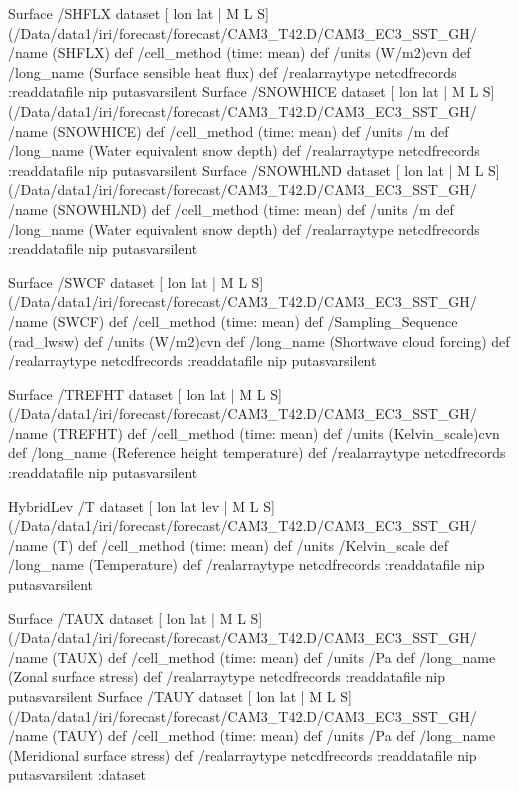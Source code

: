 \begin{ingrid}
Surface /SHFLX{
dataset
[ lon lat | M L S] (/Data/data1/iri/forecast/forecast/CAM3_T42.D/CAM3_EC3_SST_GH/%
/name (SHFLX) def
 /cell_method (time: mean) def
 /units (W/m2)cvn def
 /long_name (Surface sensible heat flux) def
 /realarraytype netcdfrecords :readdatafile
nip
}putasvarsilent
Surface /SNOWHICE{
dataset
[ lon lat | M L S] (/Data/data1/iri/forecast/forecast/CAM3_T42.D/CAM3_EC3_SST_GH/%
/name (SNOWHICE) def
 /cell_method (time: mean) def
 /units /m def
 /long_name (Water equivalent snow depth) def
 /realarraytype netcdfrecords :readdatafile
nip
}putasvarsilent
Surface /SNOWHLND{
dataset
[ lon lat | M L S] (/Data/data1/iri/forecast/forecast/CAM3_T42.D/CAM3_EC3_SST_GH/%
/name (SNOWHLND) def
 /cell_method (time: mean) def
 /units /m def
 /long_name (Water equivalent snow depth) def
 /realarraytype netcdfrecords :readdatafile
nip
}putasvarsilent


Surface /SWCF{
dataset
[ lon lat | M L S] (/Data/data1/iri/forecast/forecast/CAM3_T42.D/CAM3_EC3_SST_GH/%
/name (SWCF) def
 /cell_method (time: mean) def
 /Sampling_Sequence (rad_lwsw) def
 /units (W/m2)cvn def
 /long_name (Shortwave cloud forcing) def
 /realarraytype netcdfrecords :readdatafile
nip
}putasvarsilent

Surface /TREFHT{
dataset
[ lon lat | M L S] (/Data/data1/iri/forecast/forecast/CAM3_T42.D/CAM3_EC3_SST_GH/%
/name (TREFHT) def
 /cell_method (time: mean) def
 /units (Kelvin_scale)cvn def
 /long_name (Reference height temperature) def
 /realarraytype netcdfrecords :readdatafile
nip
}putasvarsilent

HybridLev /T{
dataset
[ lon lat lev | M L S] (/Data/data1/iri/forecast/forecast/CAM3_T42.D/CAM3_EC3_SST_GH/%
/name (T) def
 /cell_method (time: mean) def
 /units /Kelvin_scale def
 /long_name (Temperature) def
 /realarraytype netcdfrecords :readdatafile
nip
}putasvarsilent

Surface /TAUX{
dataset
[ lon lat | M L S] (/Data/data1/iri/forecast/forecast/CAM3_T42.D/CAM3_EC3_SST_GH/%
/name (TAUX) def
 /cell_method (time: mean) def
 /units /Pa def
 /long_name (Zonal surface stress) def
 /realarraytype netcdfrecords :readdatafile
nip
}putasvarsilent
Surface /TAUY{
dataset
[ lon lat | M L S] (/Data/data1/iri/forecast/forecast/CAM3_T42.D/CAM3_EC3_SST_GH/%
/name (TAUY) def
 /cell_method (time: mean) def
 /units /Pa def
 /long_name (Meridional surface stress) def
 /realarraytype netcdfrecords :readdatafile
nip
}putasvarsilent
:dataset
\end{ingrid}

